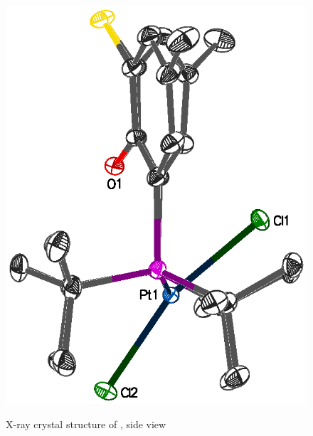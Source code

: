 \begin{figure}[htbp]
\begin{center}
\vspace{0.5cm}
\includegraphics[scale=0.8]{../Figures/Crystalthixantphosplatinumdichlorideside.eps}
\caption[X-ray crystal structure of \ce{[Pt(\tButhixantphos)Cl2]}, side view]{X-ray crystal structure of \ce{[Pt(\tButhixantphos)Cl2]}, side view}
\vspace{0.2cm}
\label{crystalthixantphosplatinumdichlorideside}
\end{center}
\end{figure}
\vspace{0.2cm}

